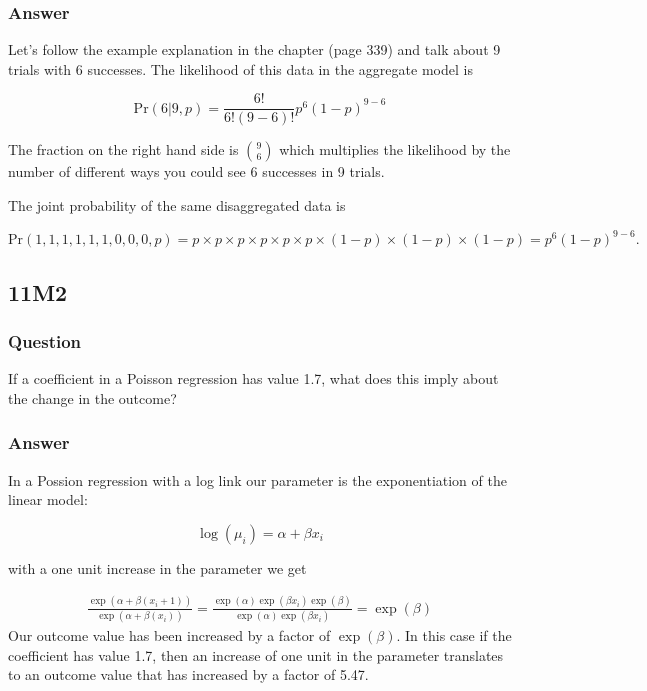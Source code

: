 \documentclass[
]{book}
\begin{document}
\hypertarget{answer-85}{%
\subsubsection*{Answer}\label{answer-85}}

Let's follow the example explanation in the chapter (page 339) and talk about 9 trials with 6 successes. The likelihood of this data in the aggregate model is

\[
\text{Pr}(6|9,p) = \frac{6!}{6!(9-6)!}p^6(1-p)^{9-6}
\]

The fraction on the right hand side is \({9 \choose 6}\) which multiplies the likelihood by the number of different ways you could see 6 successes in 9 trials.

The joint probability of the same disaggregated data is

\[
\text{Pr}(1,1,1,1,1,1,0,0,0,p) = p \times p \times p \times p \times p \times p \times (1-p) \times (1-p) \times (1-p) =p^6(1-p)^{9-6}.
\]

\hypertarget{m2-6}{%
\subsection*{11M2}\label{m2-6}}

\hypertarget{question-86}{%
\subsubsection*{Question}\label{question-86}}

If a coefficient in a Poisson regression has value 1.7, what does this imply about the change in the outcome?

\hypertarget{answer-86}{%
\subsubsection*{Answer}\label{answer-86}}

In a Possion regression with a log link our parameter is the exponentiation of the linear model:

\[
\log(\mu_i) = \alpha + \beta x_i
\]

with a one unit increase in the parameter we get

\[
\begin{aligned}
\frac{\exp(\alpha + \beta(x_i + 1) )}{\exp(\alpha + \beta(x_i))} = \frac{\exp(\alpha) \exp(\beta x_i) \exp(\beta)}{\exp(\alpha) \exp(\beta x_i)}
 = \exp(\beta)
\end{aligned}
\]
Our outcome value has been increased by a factor of \(\exp(\beta)\). In this case if the coefficient has value 1.7, then an increase of one unit in the parameter translates to an outcome value that has increased by a factor of 5.47.
\end{document}
